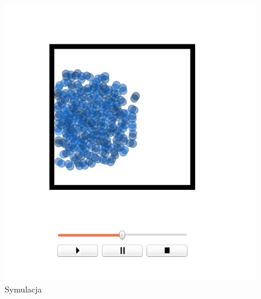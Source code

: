\begin{minipage}{0.5\textwidth}
\begin{figure}[H]
 \begin{center} 
  \includegraphics[width=\textwidth]{./rysunki/poczatek2} 
 \end{center}
 \caption{Symulacja}
 \label{fig:poczatek2} 
\end{figure}
\end{minipage}
~
